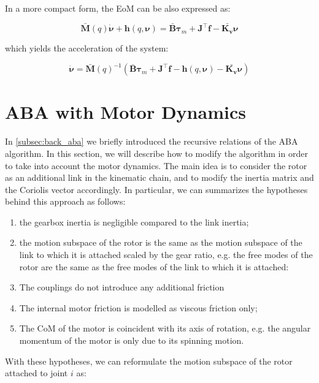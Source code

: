 In a more compact form, the \ac{EoM} can be also expressed as:

\begin{equation}
    \mathbf{\bar{M}}(q)\dot{\boldsymbol{\nu}} + \mathbf{h}(q,\boldsymbol{\nu}) = \mathbf{\bar{B}}\boldsymbol{\tau} _m + \mathbf{J} ^\top \mathbf{f} - \bar{\mathbf{K _v}}\boldsymbol{\nu}
\end{equation}

which yields the acceleration of the system:

\begin{equation}
    \dot{\boldsymbol{\nu}} = \mathbf{\bar{M}}(q) ^{-1} (\mathbf{\bar{B}}\boldsymbol{\tau} _m + \mathbf{J} ^\top \mathbf{f} - \mathbf{h}(q,\boldsymbol{\nu}) - \bar{\mathbf{K _v}}\boldsymbol{\nu})
\end{equation}

\section{ABA with Motor Dynamics}

In \cref{subsec:back_aba} we briefly introduced the recursive relations of the \ac{ABA} algorithm. In this section, we will describe how to modify the algorithm in order to take into account the motor dynamics. The main idea is to consider the rotor as an additional link in the kinematic chain, and to modify the inertia matrix and the Coriolis vector accordingly. In particular, we can summarizes the hypotheses behind this approach as follows:

\begin{enumerate}
    \item the gearbox inertia is negligible compared to the link inertia;
    \item the motion subspace of the rotor is the same as the motion subspace of the link to which it is attached scaled by the gear ratio, e.g. the free modes of the rotor are the same as the free modes of the link to which it is attached:
    \item The couplings do not introduce any additional friction
    \item The internal motor friction is modelled as viscous friction only;
    \item The \ac{CoM} of the motor is coincident with its axis of rotation, e.g. the angular momentum of the motor is only due to its spinning motion.
\end{enumerate}

With these hypotheses, we can reformulate the motion subspace of the rotor attached to joint $i$ as:

